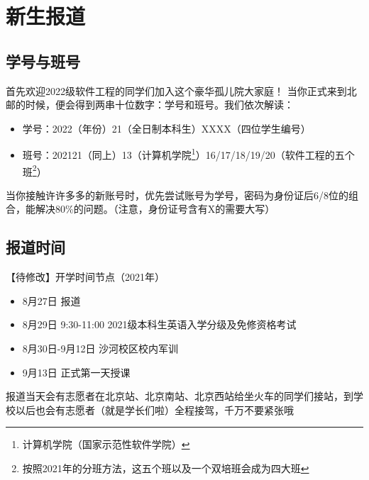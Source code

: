 \section{新生报道}

\subsection*{学号与班号}

首先欢迎2022级软件工程的同学们加入这个豪华孤儿院大家庭！
当你正式来到北邮的时候，便会得到两串十位数字：学号和班号。我们依次解读：
\begin{itemize}
    \kaishu
    \item 学号：2022（年份）21（全日制本科生）XXXX（四位学生编号）
    \item 班号：202121（同上）13（计算机学院\footnote{计算机学院（国家示范性软件学院）}）16/17/18/19/20（软件工程的五个班\footnote{按照2021年的分班方法，这五个班以及一个双培班会成为四大班}）
\end{itemize}

当你接触许许多多的新账号时，优先尝试账号为学号，密码为身份证后6/8位的组合，能解决80\%的问题。（注意，身份证号含有X的需要大写）

\subsection*{报道时间}

{\heiti 【待修改】开学时间节点（2021年）}
\begin{itemize}
    \kaishu
    \item 8月27日 报道
    \item 8月29日 9:30-11:00 2021级本科生英语入学分级及免修资格考试
    \item 8月30日-9月12日 沙河校区校内军训
    \item 9月13日 正式第一天授课
\end{itemize}

报道当天会有志愿者在北京站、北京南站、北京西站给坐火车的同学们接站，到学校以后也会有志愿者（就是学长们啦）全程接驾，千万不要紧张哦~
